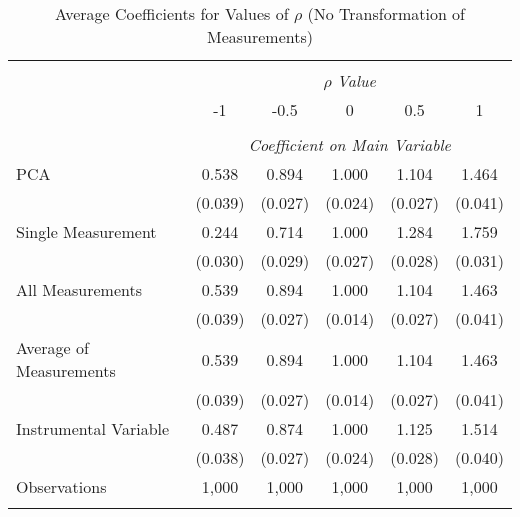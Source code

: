 \begin{table}[!htbp] \centering
  \caption{Average Coefficients for Values of $\rho$ (No Transformation of Measurements) \label{sim_rho_5_noexp}}
\begin{tabular}{@{\extracolsep{5pt}}lccccc}
\\[-1.8ex]\hline
\hline \\[-1.8ex]
& \multicolumn{5}{c}{$\rho$ \textit{ Value}} \
\cr \
\\[-1.8ex] & -1 & -0.5 & 0 & 0.5 & 1 \\
\hline \\[-1.8ex]
& \multicolumn{5}{c}{\textit{Coefficient on Main Variable}} \\
PCA & 0.538 & 0.894 & 1.000 & 1.104 & 1.464  \\
& (0.039) & (0.027) & (0.024) & (0.027) & (0.041)\\
Single Measurement & 0.244 & 0.714 & 1.000 & 1.284 & 1.759  \\
& (0.030) & (0.029) & (0.027) & (0.028) & (0.031)\\
All Measurements & 0.539 & 0.894 & 1.000 & 1.104 & 1.463  \\
  & (0.039) & (0.027) & (0.014) & (0.027) & (0.041)\\
 Average of Measurements & 0.539 & 0.894 & 1.000 & 1.104 & 1.463  \\
  & (0.039) & (0.027) & (0.014) & (0.027) & (0.041)\\
  Instrumental Variable & 0.487 & 0.874 & 1.000 & 1.125 & 1.514 \\
  & (0.038) & (0.027) & (0.024) & (0.028) & (0.040) \\
 
 Observations & 1,000 & 1,000 & 1,000 & 1,000 & 1,000\\
\hline
\hline \\[-1.8ex]
\end{tabular}
\end{table}